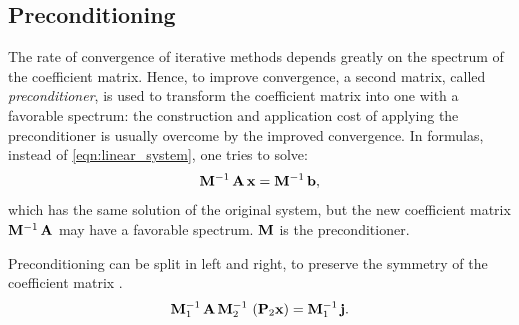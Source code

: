 
\subsection{Preconditioning} 

The rate of convergence of iterative methods depends greatly on the
spectrum of the coefficient matrix. Hence, to improve convergence, a
second matrix, called \emph{preconditioner}, is used to transform the
coefficient matrix into one with a favorable spectrum: the
construction and application cost of applying the preconditioner is
usually overcome by the improved convergence. In formulas, instead of
\eqref{eqn:linear_system}, one tries to solve:
\begin{equation} \label{eqn:linear_system_preconditioned}
  {\mathbf{M}^{-1}\,{\mathbf{A}\,\mathbf{x}}} =
  {\mathbf{M}^{-1}\,\mathbf{b}} ,
\end{equation}
which has the same solution of the original system, but the new
coefficient matrix ${\mathbf{M}^{-1}\,\mathbf{A}}$ may have a
favorable spectrum. $\mathbf{M}$ is the preconditioner.

Preconditioning can be split in left and right, to preserve the
symmetry of the coefficient matrix \cite{saad_iterative}.
\begin{equation*}
{{{\mathbf{M}_1^{-1}\,\mathbf{A}}\,\mathbf{M}_2^{-1}}\,\left(\mathbf{P}_2
  \mathbf{x}\right)} = {\mathbf{M}_1^{-1}\,\mathbf{j}} .
\end{equation*}

